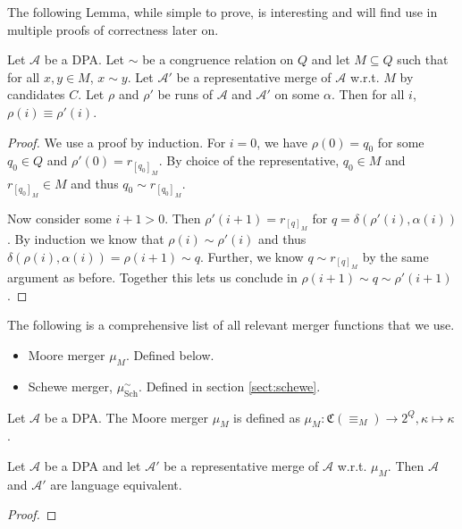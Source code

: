 The following Lemma, while simple to prove, is interesting and will find use in multiple proofs of correctness later on.

\begin{lem}
	Let $\mathcal{A}$ be a DPA. Let $\sim$ be a congruence relation on $Q$ and let $M \subseteq Q$ such that for all $x, y \in M$, $x \sim y$. Let $\mathcal{A}'$ be a representative merge of $\mathcal{A}$ w.r.t. $M$ by candidates $C$. Let $\rho$ and $\rho'$ be runs of $\mathcal{A}$ and $\mathcal{A}'$ on some $\alpha$. Then for all $i$, $\rho(i) \equiv \rho'(i)$.
	\label{lem:general:cong_stays_in_merge}
\end{lem}

\begin{proof}
	We use a proof by induction. For $i = 0$, we have $\rho(0) = q_0$ for some $q_0 \in Q$ and $\rho'(0) = r_{[q_0]_M}$. By choice of the representative, $q_0 \in M$ and $r_{[q_0]_M} \in M$ and thus $q_0 \sim r_{[q_0]_M}$.
	
	Now consider some $i+1 > 0$. Then $\rho'(i+1) = r_{[q]_M}$ for $q = \delta(\rho'(i), \alpha(i))$. By induction we know that $\rho(i) \sim \rho'(i)$ and thus $\delta(\rho(i), \alpha(i)) = \rho(i+1) \sim q$. Further, we know $q \sim r_{[q]_M}$ by the same argument as before. Together this lets us conclude in $\rho(i+1) \sim q \sim \rho'(i+1)$.
\end{proof}

The following is a comprehensive list of all relevant merger functions that we use.

\begin{itemize}
	\item Moore merger $\mu_M$. Defined below.
	\item Schewe merger, $\mu_\text{Sch}^\sim$. Defined in section \ref{sect:schewe}.
\end{itemize}

\begin{defn}
	Let $\mathcal{A}$ be a DPA. The Moore merger $\mu_M$ is defined as $\mu_M : \mathfrak{C}(\equiv_M) \rightarrow 2^Q, \kappa \mapsto \kappa$.
\end{defn}

\begin{lem}
	Let $\mathcal{A}$ be a DPA and let $\mathcal{A}'$ be a representative merge of $\mathcal{A}$ w.r.t. $\mu_M$. Then $\mathcal{A}$ and $\mathcal{A}'$ are language equivalent.
\end{lem}

\begin{proof}
\end{proof}





